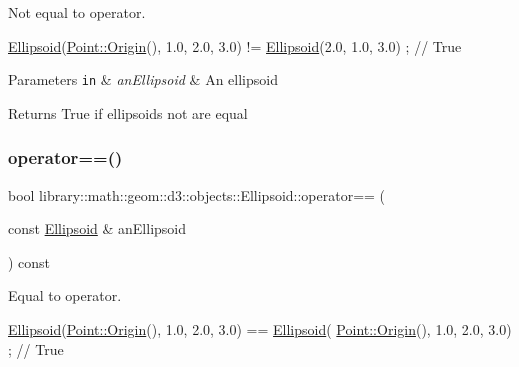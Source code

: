 Not equal to operator. 


\begin{DoxyCode}
\hyperlink{classlibrary_1_1math_1_1geom_1_1d3_1_1objects_1_1_ellipsoid_aae81fe0edc7f0e8d4590ea89ae73cb14}{Ellipsoid}(\hyperlink{classlibrary_1_1math_1_1geom_1_1d3_1_1objects_1_1_point_ab2a38e285c562e50bf350272c083986f}{Point::Origin}(), 1.0, 2.0, 3.0) != \hyperlink{classlibrary_1_1math_1_1geom_1_1d3_1_1objects_1_1_ellipsoid_aae81fe0edc7f0e8d4590ea89ae73cb14}{Ellipsoid}(2.0, 1.0, 3.0) ; \textcolor{comment}{//
       True}
\end{DoxyCode}



\begin{DoxyParams}[1]{Parameters}
\mbox{\tt in}  & {\em an\+Ellipsoid} & An ellipsoid \\
\hline
\end{DoxyParams}
\begin{DoxyReturn}{Returns}
True if ellipsoids not are equal 
\end{DoxyReturn}
\mbox{\label{classlibrary_1_1math_1_1geom_1_1d3_1_1objects_1_1_ellipsoid_a259ca94e493d1e8694292aaa579ae1e7}} 
\subsubsection{\texorpdfstring{operator==()}{operator==()}}
{\footnotesize\ttfamily bool library\+::math\+::geom\+::d3\+::objects\+::\+Ellipsoid\+::operator== (\begin{DoxyParamCaption}\item[{const \hyperlink{classlibrary_1_1math_1_1geom_1_1d3_1_1objects_1_1_ellipsoid}{Ellipsoid} \&}]{an\+Ellipsoid }\end{DoxyParamCaption}) const}



Equal to operator. 


\begin{DoxyCode}
\hyperlink{classlibrary_1_1math_1_1geom_1_1d3_1_1objects_1_1_ellipsoid_aae81fe0edc7f0e8d4590ea89ae73cb14}{Ellipsoid}(\hyperlink{classlibrary_1_1math_1_1geom_1_1d3_1_1objects_1_1_point_ab2a38e285c562e50bf350272c083986f}{Point::Origin}(), 1.0, 2.0, 3.0) == \hyperlink{classlibrary_1_1math_1_1geom_1_1d3_1_1objects_1_1_ellipsoid_aae81fe0edc7f0e8d4590ea89ae73cb14}{Ellipsoid}(
      \hyperlink{classlibrary_1_1math_1_1geom_1_1d3_1_1objects_1_1_point_ab2a38e285c562e50bf350272c083986f}{Point::Origin}(), 1.0, 2.0, 3.0) ; \textcolor{comment}{// True}
\end{DoxyCode}



